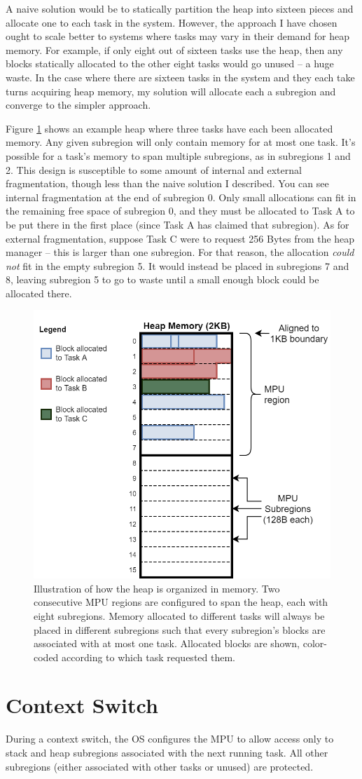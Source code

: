 A naive solution would be to statically partition the heap into sixteen pieces and allocate one to each task in the system. However, the approach I have chosen ought to scale better to systems where tasks may vary in their demand for heap memory. For example, if only eight out of sixteen tasks use the heap, then any blocks statically allocated to the other eight tasks would go unused -- a huge waste. In the case where there are sixteen tasks in the system and they each take turns acquiring heap memory, my solution will allocate each a subregion and converge to the simpler approach.

Figure \ref{fig:heap_prot} shows an example heap where three tasks have each been allocated memory. Any given subregion will only contain memory for at most one task. It's possible for a task's memory to span multiple subregions, as in subregions 1 and 2. This design is susceptible to some amount of internal and external fragmentation, though less than the naive solution I described. You can see internal fragmentation at the end of subregion 0. Only small allocations can fit in the remaining free space of subregion 0, and they must be allocated to Task A to be put there in the first place (since Task A has claimed that subregion). As for external fragmentation, suppose Task C were to request 256 Bytes from the heap manager -- this is larger than one subregion. For that reason, the allocation \textit{could not} fit in the empty subregion 5. It would instead be placed in subregions 7 and 8, leaving subregion 5 to go to waste until a small enough block could be allocated there.

\begin{figure}[hbtp]
	\centering
	\includegraphics[width=0.7\linewidth]{figs/heap_prot.png}
	\caption{Illustration of how the heap is organized in memory. Two consecutive MPU regions are configured to span the heap, each with eight subregions. Memory allocated to different tasks will always be placed in different subregions such that every subregion's blocks are associated with at most one task. Allocated blocks are shown, color-coded according to which task requested them.}
	\label{fig:heap_prot}
\end{figure}

\section{Context Switch}

During a context switch, the OS configures the MPU to allow access only to stack and heap subregions associated with the next running task. All other subregions (either associated with other tasks or unused) are protected.